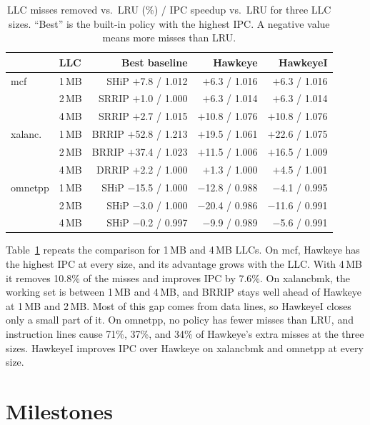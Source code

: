 \documentclass[10pt,journal,compsoc]{IEEEtran}
\begin{document}
\begin{table}[t]
\centering
\caption{LLC misses removed vs.\ LRU (\%) / IPC speedup vs.\ LRU for three LLC
sizes. ``Best'' is the built-in policy with the highest IPC. A negative value
means more misses than LRU.}
\label{tab:sweep}
\setlength{\tabcolsep}{3.2pt}
\begin{tabular}{@{}llrrr@{}}
\toprule
& LLC & Best baseline & Hawkeye & HawkeyeI \\
\midrule
mcf & 1\,MB & SHiP $+$7.8 / 1.012 & $+$6.3 / 1.016 & $+$6.3 / 1.016 \\
& 2\,MB & SRRIP $+$1.0 / 1.000 & $+$6.3 / 1.014 & $+$6.3 / 1.014 \\
& 4\,MB & SRRIP $+$2.7 / 1.015 & $+$10.8 / 1.076 & $+$10.8 / 1.076 \\
\midrule
xalanc. & 1\,MB & BRRIP $+$52.8 / 1.213 & $+$19.5 / 1.061 & $+$22.6 / 1.075 \\
& 2\,MB & BRRIP $+$37.4 / 1.023 & $+$11.5 / 1.006 & $+$16.5 / 1.009 \\
& 4\,MB & DRRIP $+$2.2 / 1.000 & $+$1.3 / 1.000 & $+$4.5 / 1.001 \\
\midrule
omnetpp & 1\,MB & SHiP $-$15.5 / 1.000 & $-$12.8 / 0.988 & $-$4.1 / 0.995 \\
& 2\,MB & SHiP $-$3.0 / 1.000 & $-$20.4 / 0.986 & $-$11.6 / 0.991 \\
& 4\,MB & SHiP $-$0.2 / 0.997 & $-$9.9 / 0.989 & $-$5.6 / 0.991 \\
\bottomrule
\end{tabular}
\end{table}

Table~\ref{tab:sweep} repeats the comparison for 1\,MB and 4\,MB LLCs. On mcf,
Hawkeye has the highest IPC at every size, and its advantage grows with the
LLC. With 4\,MB it removes 10.8\% of the misses and improves IPC by 7.6\%. On
xalancbmk, the working set is between 1\,MB and 4\,MB, and BRRIP stays well
ahead of Hawkeye at 1\,MB and 2\,MB. Most of this gap comes from data lines, so
HawkeyeI closes only a small part of it. On omnetpp, no policy has fewer misses
than LRU, and
instruction lines cause 71\%, 37\%, and 34\% of Hawkeye's extra misses at the
three sizes. HawkeyeI improves IPC over Hawkeye on xalancbmk and omnetpp at
every size.

\section{Milestones}
\end{document}
